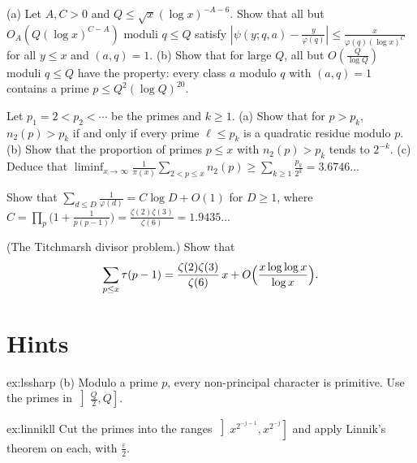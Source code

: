 \begin{exercise}[$\star\star$]\label{ex:goodmoduli}
(a) Let $A,C>0$ and $Q\le\sqrt x(\log x)^{-A-6}$. Show that all but $O_{A}(Q(\log x)^{C-A})$ moduli $q\le Q$ satisfy $|\psi(y;q,a)-\frac y{\varphi(q)}|\le\frac x{\varphi(q)(\log x)^C}$ for all $y\le x$ and $(a,q)=1$.
(b) Show that for large $Q$, all but $O(\frac Q{\log Q})$ moduli $q\le Q$ have the property: every class $a$ modulo $q$ with $(a,q)=1$ contains a prime $p\le Q^2(\log Q)^{20}$.
\end{exercise}

\begin{exercise}[$\star\star$]\label{ex:erdosn2}
Let $p_1=2<p_2<\cdots$ be the primes and $k\ge1$.
(a) Show that for $p>p_k$, $n_2(p)>p_k$ if and only if every prime $\ell\le p_k$ is a quadratic residue modulo $p$.
(b) Show that the proportion of primes $p\le x$ with $n_2(p)>p_k$ tends to $2^{-k}$.
(c) Deduce that $\liminf_{x\to\infty}\frac1{\pi(x)}\sum_{2<p\le x}n_2(p)\ge\sum_{k\ge1}\frac{p_k}{2^k}=3.6746\ldots$
\end{exercise}

\begin{exercise}[$\star\star$]\label{ex:phisum}
Show that $\sum_{d\le D}\frac1{\varphi(d)}=C\log D+O(1)$ for $D\ge1$, where
$C=\prod_p\bigl(1+\frac1{p(p-1)}\bigr)=\frac{\zeta(2)\zeta(3)}{\zeta(6)}=1.9435\ldots$
\end{exercise}

\begin{exercise}[$\star\star\star$]\label{ex:titchmarsh}
(The Titchmarsh divisor problem.) Show that
\[
\sum_{p\le x}\tau(p-1)=\frac{\zeta(2)\zeta(3)}{\zeta(6)}\,x+O\Bigl(\frac{x\log\log x}{\log x}\Bigr).
\]
\end{exercise}

\section{Hints}

\begin{hint}{ex:lssharp}
(b) Modulo a prime $p$, every non-principal character is primitive. Use the primes in $\left]\frac Q2,Q\right]$.
\end{hint}

\begin{hint}{ex:linnikll}
Cut the primes into the ranges $\left]x^{2^{-j-1}},x^{2^{-j}}\right]$ and apply Linnik's theorem on each, with $\frac\varepsilon2$.
\end{hint}

